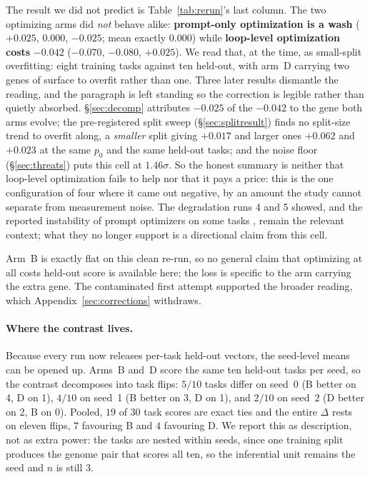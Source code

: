 \documentclass[11pt]{article}
\newcommand{\dd}{\ensuremath{\Delta}}
\begin{document}
The result we did not predict is Table~\ref{tab:rerun}'s last column. The two optimizing arms did
\emph{not} behave alike:
\textbf{prompt-only optimization is a wash} ($+0.025$, $0.000$, $-0.025$; mean exactly $0.000$) while \textbf{loop-level optimization costs} $-0.042$ ($-0.070$, $-0.080$, $+0.025$). We read that, at the time, as small-split overfitting: eight training tasks against ten
held-out, with arm~D carrying two genes of surface to overfit rather than one. Three later results
dismantle the reading, and the paragraph is left standing so the correction is legible rather than
quietly absorbed. \S\ref{sec:decomp} attributes $-0.025$ of the $-0.042$ to the gene both arms
evolve; the pre-registered split sweep (\S\ref{sec:splitresult}) finds no split-size trend to
overfit along, a \emph{smaller} split giving $+0.017$ and larger ones $+0.062$ and $+0.023$ at the
same $p_0$ and the same held-out tasks; and the noise floor (\S\ref{sec:threats}) puts this cell at
$1.46\sigma$. So the honest summary is neither that loop-level optimization fails to help nor that
it pays a price: this is the one configuration of four where it came out negative, by an amount
the study cannot separate from measurement noise. The degradation runs 4 and 5 showed, and the
reported instability of prompt optimizers on some tasks
\citep{yang2023opro,zhou2025bbopromptscale}, remain the relevant context; what they no longer
support is a directional claim from this cell.

Arm~B is exactly flat on this clean re-run, so no general claim that optimizing at all costs
held-out score is available here; the loss is specific to the arm carrying the extra gene. The
contaminated first attempt supported the broader reading, which
Appendix~\ref{sec:corrections} withdraws.

\paragraph{Where the contrast lives.}
Because every run now releases per-task held-out vectors, the seed-level means can be opened
up. Arms~B and~D score the same ten held-out tasks per seed, so the contrast decomposes into
task flips: $5/10$ tasks differ on seed~0 (B better on 4, D on 1), $4/10$ on seed~1 (B better
on 3, D on 1), and $2/10$ on seed~2 (D better on 2, B on 0). Pooled, $19$ of $30$ task scores
are exact ties and the entire $\dd$ rests on eleven flips, $7$ favouring B and $4$ favouring
D. We report this as description, not as extra power: the tasks
are nested within seeds, since one training split produces the genome pair that scores all
ten, so the inferential unit remains the seed and $n$ is still $3$.
\end{document}
